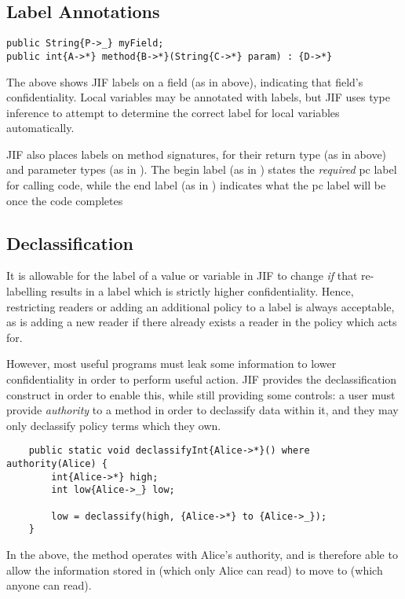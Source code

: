 \subsection{Label Annotations}

\begin{verbatim}
public String{P->_} myField;
public int{A->*} method{B->*}(String{C->*} param) : {D->*}
\end{verbatim}

The above shows JIF labels on a field (as in  above), indicating that field's confidentiality. Local variables may be annotated with labels, but JIF uses type inference to attempt to determine the correct label for local variables automatically.

JIF also places labels on method signatures, for their return type (as in  above) and parameter types (as in ). The begin label (as in ) states the \textit{required} pc label for calling code, while the end label (as in ) indicates what the pc label will be once the code completes

\subsection{Declassification}

It is allowable for the label of a value or variable in JIF to change \textit{if} that re-labelling results in a label which is strictly higher confidentiality. Hence, restricting readers or adding an additional policy to a label is always acceptable, as is adding a new reader  if there already exists a reader in the policy which  acts for.

However, most useful programs must leak some information to lower confidentiality in order to perform useful action. JIF provides the declassification construct in order to enable this, while still providing some controls: a user must provide \textit{authority} to a method in order to declassify data within it, and they may only declassify policy terms which they own.

\begin{verbatim}
	public static void declassifyInt{Alice->*}() where authority(Alice) {
		int{Alice->*} high;
		int low{Alice->_} low;
		
		low = declassify(high, {Alice->*} to {Alice->_});
	}
\end{verbatim}

In the above, the method operates with Alice's authority, and is therefore able to allow the information stored in  (which only Alice can read) to move to  (which anyone can read).



